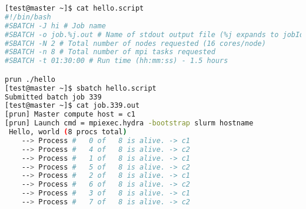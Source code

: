 \begin{lstlisting}[language=bash,keywords={}]
[test@master ~]$ cat hello.script
#!/bin/bash
#SBATCH -J hi # Job name
#SBATCH -o job.%j.out # Name of stdout output file (%j expands to jobId)
#SBATCH -N 2 # Total number of nodes requested (16 cores/node)
#SBATCH -n 8 # Total number of mpi tasks requested
#SBATCH -t 01:30:00 # Run time (hh:mm:ss) - 1.5 hours

prun ./hello
[test@master ~]$ sbatch hello.script
Submitted batch job 339
[test@master ~]$ cat job.339.out
[prun] Master compute host = c1
[prun] Launch cmd = mpiexec.hydra -bootstrap slurm hostname
 Hello, world (8 procs total)
    --> Process #   0 of   8 is alive. -> c1
    --> Process #   4 of   8 is alive. -> c2
    --> Process #   1 of   8 is alive. -> c1
    --> Process #   5 of   8 is alive. -> c2
    --> Process #   2 of   8 is alive. -> c1
    --> Process #   6 of   8 is alive. -> c2
    --> Process #   3 of   8 is alive. -> c1
    --> Process #   7 of   8 is alive. -> c2
\end{lstlisting}

